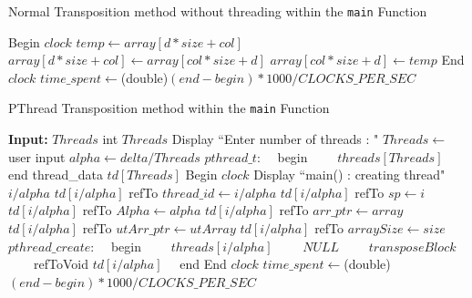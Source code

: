 \documentclass[10pt, conference]{IEEEtran}
\def\code#1{\texttt{#1}}
\begin{document}
\begin{appendices}
\begin{algorithm}[h!]
\begin{algorithmic}
\end{algorithmic}
\end{algorithm}

\begin{algorithm}[h!]
\caption{Normal Transposition method without threading within the \code{main} Function}
\label{Normal Transposition}
\begin{algorithmic} 
\STATE Begin $clock$
\STATE
{}
		\STATE $temp \leftarrow array[d*size + col]$
		\STATE $array[d*size + col] \leftarrow array[col*size + d]$
		\STATE $array[col*size + d] \leftarrow temp$
	\ENDFOR
\ENDFOR
\STATE
\STATE End $clock$
\STATE $time\_spent \leftarrow $(double)$(end-begin)*1000/CLOCKS\_PER\_SEC$

\end{algorithmic}
\end{algorithm}

\begin{algorithm}[h!]
\caption{PThread Transposition method within the \code{main} Function}
\label{PThread Transposition}
\begin{algorithmic} 
\STATE \textbf{Input:} $Threads$
\STATE
\STATE int $Threads$
\STATE Display ``Enter number of threads : "
\STATE $Threads \leftarrow$ user input
\STATE $alpha \leftarrow delta/Threads$
\STATE $pthread\_t$:
	\STATE $\quad$begin
		\STATE $\qquad threads[Threads]$
	\STATE $\quad$end
\STATE thread\_data $td[Threads]$
\STATE
\STATE Begin $clock$
\STATE
{}
	\STATE Display ``main() : creating thread" $i/alpha$
	\STATE
	\STATE $td[i/alpha]$ refTo $thread\_id \leftarrow i/alpha$
	\STATE $td[i/alpha]$ refTo $sp \leftarrow i$
	\STATE $td[i/alpha]$ refTo $Alpha \leftarrow alpha$
	\STATE $td[i/alpha]$ refTo $arr\_ptr \leftarrow array$
	\STATE $td[i/alpha]$ refTo $utArr\_ptr \leftarrow utArray$
	\STATE $td[i/alpha]$ refTo $arraySize \leftarrow size$
	\STATE $pthread\_create$:
		\STATE $\quad$begin
			\STATE $\qquad threads[i/alpha]$
			\STATE $\qquad NULL$
			\STATE $\qquad transposeBlock$
			\STATE $\qquad$refToVoid $td[i/alpha]$
		\STATE $\quad$end
\ENDFOR
\STATE
\STATE End $clock$
\STATE $time\_spent \leftarrow $(double)$(end-begin)*1000/CLOCKS\_PER\_SEC$

\end{algorithmic}
\end{algorithm}

\end{appendices}



\end{document}
